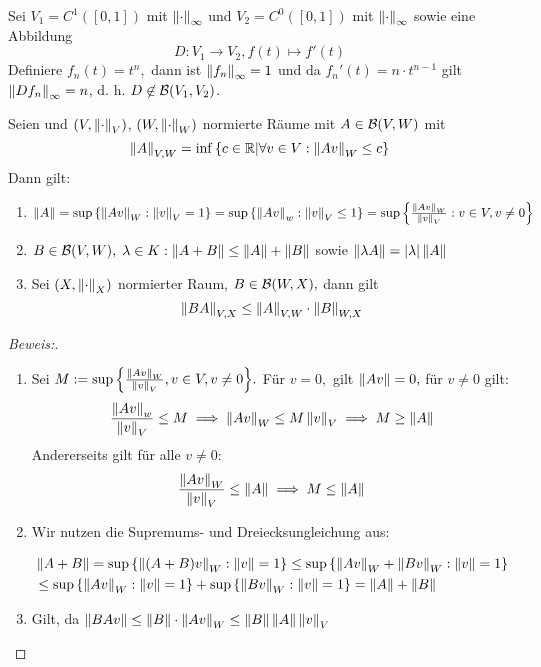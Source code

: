 \begin{ex} \label{Differential_op}
    Sei $V_1 = C^1([0, 1])$ mit $\norms{\cdot}$ und $V_2 = C^0([0, 1])$ mit $\norms{\cdot}$ sowie eine Abbildung \[D: V_1 \to V_2, f(t) \mapsto f'(t)\]
    Definiere $f_n(t) = t^n,$ dann ist $\norms{f_n} = 1$ und da $f_n'(t) = n \cdot t^{n-1}$ gilt $\norms{Df_n} = n$, d. h. \(D \not\in \B(V_1, V_2)\).
\end{ex}

\begin{theorem}
    Seien und $(V, \normn\cdot V)$, $(W, \norm{\cdot}_W)$ normierte Räume mit $ A \in \B(V, W)$ mit \[\norm{A}_{V,W} = \inf{\set{c \in \mathbb{R}| \forall v \in V: \norm{Av}_{W} \leq c}}\] Dann gilt:
    \begin{enumerate}
        \item $\norm{A} = \sup{\set{\norm{Av}_W: \norm{v}_V = 1}} = \sup{\set{\norm{Av}_w: \norm{v}_V \leq 1}} = \sup{\set{\frac{\norm{Av}_W}{\norm{v}_V}: v \in V, v \not=0}}$
        \item $B \in \B(V, W), \;\lambda \in K: \norm{A +B} \le \norm{A}+\norm{B}$ sowie $\norm{\lambda A} = \ab{\lambda}\norm{A}$
        \item Sei $(X, \norm{\cdot}_X)$ normierter Raum, $B \in \B(W, X),$ dann gilt 
        \[\norm{BA}_{V,X} \leq \norm{A}_{V,W}\cdot\norm{B}_{W,X}\]
    \end{enumerate}
    
    \begin{proof}[Beweis:]
    \begin{enumerate}
        \item Sei $M := \sup{\set{\frac{\norm{Av}_W}{\norm{v}_V}, v\in V, v \not= 0}}.$ Für $v = 0,$ gilt $\norm{Av} = 0,$ für $v \not=0$ gilt:
        \[\frac{\norm{Av}_w}{\norm{v}_V} \leq M \implies \norm{Av}_W \leq M \norm{v}_V \implies M \geq \norm{A}\]
        Andererseits gilt für alle $v \not= 0:$
        \[\frac{\norm{Av}_W}{\norm{v}_V} \leq \norm{A} \implies M \leq \norm A\]
        \item Wir nutzen die Supremums- und Dreiecksungleichung aus:
        
        \begin{align*}
        & \norm{A+B} = \sup{\set{\norm{(A+B)v}_W: \norm{v} = 1}} \leq \sup{\set{\norm{Av}_W+\norm{Bv}_W: \norm{v} = 1}} \\
        & \leq \sup{\set{\norm{Av}_W: \norm{v} = 1}} + \sup{\set{\norm{Bv}_W: \norm{v} = 1}} = \norm{A}+ \norm{B}
        \end{align*}
        \item Gilt, da $\norm{BAv} \leq \norm{B}\cdot \norm{Av}_W \leq \norm{B} \norm{A} \norm{v}_V$
        
    \end{enumerate}
    \end{proof}
\end{theorem}


